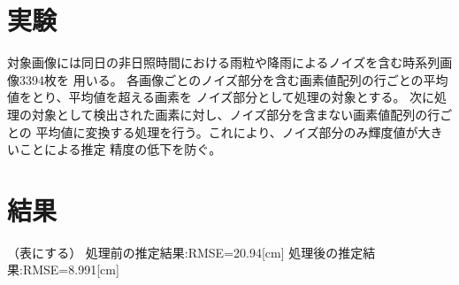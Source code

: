 \documentclass[10pt,a4j,twocolumn,oneside]{jsarticle}
\begin{document}

\section{実験}
対象画像には同日の非日照時間における雨粒や降雨によるノイズを含む時系列画像3394枚を
用いる。
各画像ごとのノイズ部分を含む画素値配列の行ごとの平均値をとり、平均値を超える画素を
ノイズ部分として処理の対象とする。
次に処理の対象として検出された画素に対し、ノイズ部分を含まない画素値配列の行ごとの
平均値に変換する処理を行う。これにより、ノイズ部分のみ輝度値が大きいことによる推定
精度の低下を防ぐ。
\section{結果}
（表にする）
処理前の推定結果:RMSE=20.94[cm]
処理後の推定結果:RMSE=8.991[cm]
\end{document}
